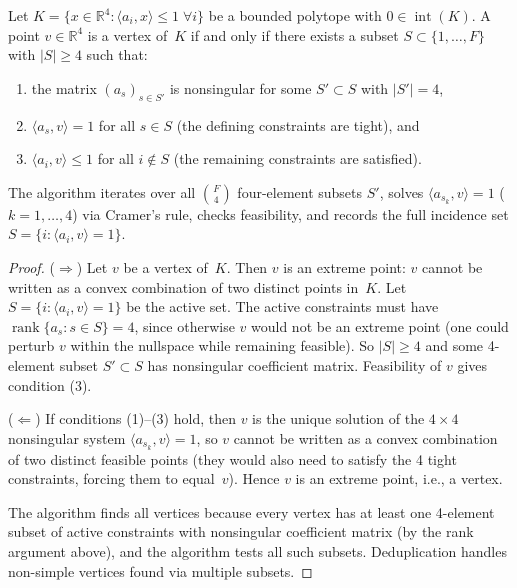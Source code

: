 \begin{unverified}
\begin{lemma}\label{lem:vertex-enumeration}
Let $K = \{x \in \mathbb{R}^4 : \langle a_i, x \rangle \leq 1 \;\forall i\}$
be a bounded polytope with $0 \in \operatorname{int}(K)$.
A point $v \in \mathbb{R}^4$ is a vertex of~$K$ if and only if there exists
a subset $S \subset \{1,\ldots,F\}$ with $|S| \geq 4$ such that:
\begin{enumerate}
  \item the matrix $(a_s)_{s \in S'}$ is nonsingular for some
    $S' \subset S$ with $|S'| = 4$,
  \item $\langle a_s, v \rangle = 1$ for all $s \in S$ (the defining
    constraints are tight), and
  \item $\langle a_i, v \rangle \leq 1$ for all $i \notin S$ (the
    remaining constraints are satisfied).
\end{enumerate}
The algorithm iterates over all $\binom{F}{4}$ four-element subsets $S'$,
solves $\langle a_{s_k}, v \rangle = 1$ ($k = 1,\ldots,4$) via Cramer's
rule, checks feasibility, and records the full incidence set
$S = \{i : \langle a_i, v \rangle = 1\}$.
\end{lemma}

\begin{proof}
($\Rightarrow$) Let $v$ be a vertex of~$K$. Then $v$ is an extreme point:
$v$ cannot be written as a convex combination of two distinct points in~$K$.
Let $S = \{i : \langle a_i, v \rangle = 1\}$ be the active set.
The active constraints must have $\operatorname{rank}\{a_s : s \in S\} = 4$,
since otherwise $v$ would not be an extreme point (one could perturb $v$
within the nullspace while remaining feasible). So $|S| \geq 4$ and some
4-element subset $S' \subset S$ has nonsingular coefficient matrix.
Feasibility of $v$ gives condition (3).

($\Leftarrow$) If conditions (1)--(3) hold, then $v$ is the unique solution
of the $4 \times 4$ nonsingular system $\langle a_{s_k}, v \rangle = 1$,
so $v$ cannot be written as a convex combination of two distinct feasible
points (they would also need to satisfy the 4 tight constraints, forcing
them to equal~$v$). Hence $v$ is an extreme point, i.e., a vertex.

The algorithm finds all vertices because every vertex has at least one
4-element subset of active constraints with nonsingular coefficient matrix
(by the rank argument above), and the algorithm tests all such subsets.
Deduplication handles non-simple vertices found via multiple subsets.
\end{proof}
\end{unverified}


